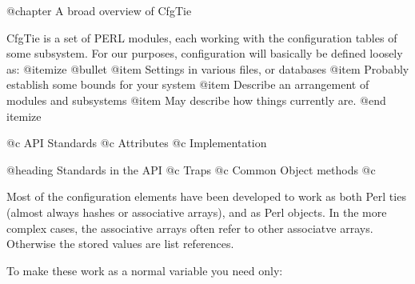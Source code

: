 @chapter A broad overview of CfgTie

CfgTie is a set of PERL modules, each working with the configuration tables of
some subsystem.    For our purposes, configuration will basically be defined
loosely as:
@itemize @bullet
@item Settings in various files, or databases
@item Probably establish some bounds for your system
@item Describe an arrangement of modules and subsystems
@item May describe how things currently are.
@end itemize
 
@c API Standards
@c Attributes
@c Implementation

@heading Standards in the API
@c Traps
@c Common Object methods
@c

Most of the configuration elements have been developed to work as both Perl
ties (almost always hashes or associative arrays), and as Perl objects.  In
the more complex cases, the associative arrays often refer to other associatve
arrays.  Otherwise the stored values are list references.

To make these work as a normal variable you need only:

